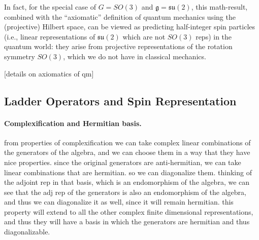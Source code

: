 In fact, for the special case of \(G=SO(3)\) and \(\mathfrak{g} = \mathfrak{su}(2)\), this math-result, combined with the “axiomatic” definition of quantum mechanics using the (projective) Hilbert space, can be viewed as predicting half-integer spin particles (i.e., linear representations of \(\mathfrak{su}(2)\) which are not \(SO(3)\) reps) in the quantum world: they arise from projective representations of the rotation symmetry \(SO(3)\), which we do not have in classical mechanics.

    [details on axiomatics of qm]

\subsection{Ladder Operators and Spin Representation}

\paragraph{Complexification and Hermitian basis.} from properties of complexification we can take complex linear combinations of the generators of the algebra, and we can choose them in a way that they have nice properties. since the original generators are anti-hermitian, we can take linear combinations that are hermitian. so we can diagonalize them. thinking of the adjoint rep in that basis, which is an endomorphism of the algebra, we can see that the adj rep of the generators is also an endomorphism of the algebra, and thus we can diagonalize it as well, since it will remain hermitian. this property will extend to all the other complex finite dimensional representations, and thus they will have a basis in which the generators are hermitian and thus diagonalizable.

